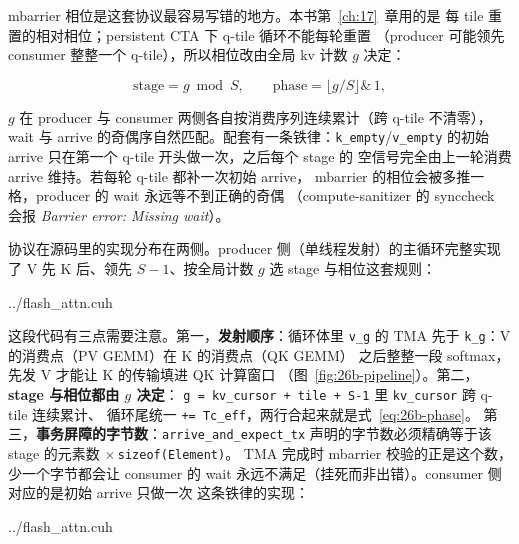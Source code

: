mbarrier 相位是这套协议最容易写错的地方。本书第~\ref{ch:17}~章用的是
每 tile 重置的相对相位；persistent CTA 下 q-tile 循环不能每轮重置
（producer 可能领先 consumer 整整一个 q-tile），所以相位改由全局
kv 计数 $g$ 决定：

\begin{equation}\label{eq:26b-phase}
  \text{stage} = g \bmod S, \qquad \text{phase} = \lfloor g/S \rfloor \&\, 1 ,
\end{equation}

$g$ 在 producer 与 consumer 两侧各自按消费序列连续累计（跨 q-tile 不清零），
wait 与 arrive 的奇偶序自然匹配。配套有一条铁律：\texttt{k\_\allowbreak{}empty}/\texttt{v\_\allowbreak{}empty}
的初始 arrive 只在第一个 q-tile 开头做一次，之后每个 stage 的
空信号完全由上一轮消费 arrive 维持。若每轮 q-tile 都补一次初始 arrive，
mbarrier 的相位会被多推一格，producer 的 wait 永远等不到正确的奇偶
（compute-sanitizer 的 synccheck 会报 \emph{Barrier error: Missing wait}）。

协议在源码里的实现分布在两侧。producer 侧（单线程发射）的主循环完整实现了
V 先 K 后、领先 $S{-}1$、按全局计数 $g$ 选 stage 与相位这套规则：

\begin{lstinputlisting}[linerange={3772-3802},firstnumber=auto,
  title={flash\_attn.cuh L3772-3802（producer 主循环：V-first-then-K 预取，$g$ 全局计数）}]{../flash_attn.cuh}
\end{lstinputlisting}

这段代码有三点需要注意。第一，\textbf{发射顺序}：循环体里 \texttt{v\_g} 的
TMA 先于 \texttt{k\_g}：V 的消费点（PV GEMM）在 K 的消费点（QK GEMM）
之后整整一段 softmax，先发 V 才能让 K 的传输填进 QK 计算窗口
（图~\ref{fig:26b-pipeline}）。第二，\textbf{stage 与相位都由 $g$ 决定}：
\texttt{g = kv\_cursor + tile + S-1} 里 \texttt{kv\_cursor} 跨 q-tile 连续累计、
循环尾统一 \texttt{+= Tc\_eff}，两行合起来就是式~\eqref{eq:26b-phase}。
第三，\textbf{事务屏障的字节数}：\texttt{arrive\_\allowbreak{}and\_\allowbreak{}expect\_\allowbreak{}tx}
声明的字节数必须精确等于该 stage 的元素数 $\times$\,\texttt{sizeof(Element)}。
TMA 完成时 mbarrier 校验的正是这个数，少一个字节都会让 consumer 的
wait 永远不满足（挂死而非出错）。consumer 侧对应的是初始 arrive 只做一次
这条铁律的实现：

\begin{lstinputlisting}[linerange={3864-3881},firstnumber=auto,
  title={flash\_attn.cuh L3864-3881（consumer：首轮一次性标记全部 stage 为 empty）}]{../flash_attn.cuh}
\end{lstinputlisting}

